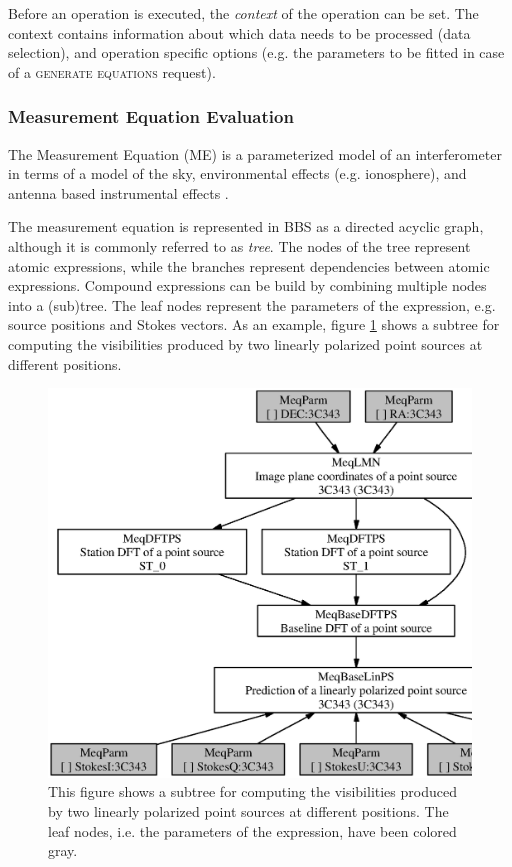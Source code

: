 \documentclass[10pt]{lofar}
\newcommand{\generate}{\textsc{generate equations}\xspace}
\begin{document}
Before an operation is executed, the \emph{context} of the operation can be set.
The context contains information about which data needs to be processed (data
selection), and operation specific options (e.g. the parameters to be fitted in
case of a \generate request).

\subsubsection{Measurement Equation Evaluation}
\label{subsubsec:design-me-evaluation}

The Measurement Equation (ME) is a parameterized model of an interferometer in
terms of a model of the sky, environmental effects (e.g. ionosphere), and
antenna based instrumental effects \cite{Hamaker1996-1, aips++note185,
LOFAR-ASTRON-ADD-015}.

The measurement equation is represented in BBS as a directed acyclic graph,
although it is commonly referred to as \emph{tree}. The nodes of the tree
represent atomic expressions, while the branches represent dependencies between
atomic expressions. Compound expressions can be build by combining multiple
nodes into a (sub)tree. The leaf nodes represent the parameters of the
expression, e.g. source positions and Stokes vectors. As an example, figure
\ref{fig:expr_tree} shows a subtree for computing the visibilities produced by
two linearly polarized point sources at different positions.

\begin{figure}[htbp]
\centering
\includegraphics[width=\textwidth]{images/expr_graph_sdd.ps}
\caption{This figure shows a subtree for computing the visibilities produced by
two linearly polarized point sources at different positions. The leaf nodes,
i.e. the parameters of the expression, have been colored gray.}
\label{fig:expr_tree}
\end{figure}
\end{document}
